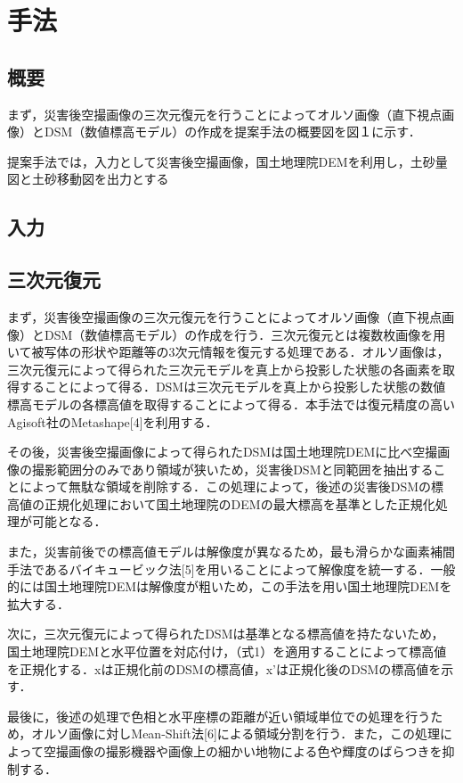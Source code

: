 \chapter{手法}
  \section{概要}
    まず，災害後空撮画像の三次元復元を行うことによってオルソ画像（直下視点画像）とDSM（数値標高モデル）の作成を提案手法の概要図を図１に示す．
  
  提案手法では，入力として災害後空撮画像，国土地理院DEMを利用し，土砂量図と土砂移動図を出力とする

  
  \section{入力}

  \section{三次元復元}
    まず，災害後空撮画像の三次元復元を行うことによってオルソ画像（直下視点画像）とDSM（数値標高モデル）の作成を行う．三次元復元とは複数枚画像を用いて被写体の形状や距離等の3次元情報を復元する処理である．オルソ画像は，三次元復元によって得られた三次元モデルを真上から投影した状態の各画素を取得することによって得る．DSMは三次元モデルを真上から投影した状態の数値標高モデルの各標高値を取得することによって得る．本手法では復元精度の高いAgisoft社のMetashape[4]を利用する．

    その後，災害後空撮画像によって得られたDSMは国土地理院DEMに比べ空撮画像の撮影範囲分のみであり領域が狭いため，災害後DSMと同範囲を抽出することによって無駄な領域を削除する．この処理によって，後述の災害後DSMの標高値の正規化処理において国土地理院のDEMの最大標高を基準とした正規化処理が可能となる．
  
    また，災害前後での標高値モデルは解像度が異なるため，最も滑らかな画素補間手法であるバイキュービック法[5]を用いることによって解像度を統一する．一般的には国土地理院DEMは解像度が粗いため，この手法を用い国土地理院DEMを拡大する．
    
    次に，三次元復元によって得られたDSMは基準となる標高値を持たないため，国土地理院DEMと水平位置を対応付け，（式1）を適用することによって標高値を正規化する．xは正規化前のDSMの標高値，x’は正規化後のDSMの標高値を示す．
    
    最後に，後述の処理で色相と水平座標の距離が近い領域単位での処理を行うため，オルソ画像に対しMean-Shift法[6]による領域分割を行う．また，この処理によって空撮画像の撮影機器や画像上の細かい地物による色や輝度のばらつきを抑制する．

